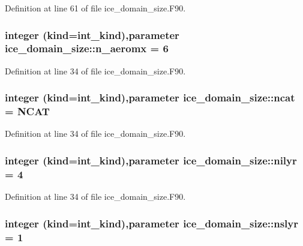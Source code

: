 Definition at line 61 of file ice\_\-domain\_\-size.F90.\hypertarget{namespaceice__domain__size_a61a60feb03a21a007ce6e62858188393}{
\subsubsection[{n\_\-aeromx}]{\setlength{\rightskip}{0pt plus 5cm}integer (kind=int\_\-kind),parameter {\bf ice\_\-domain\_\-size::n\_\-aeromx} = 6}}
\label{namespaceice__domain__size_a61a60feb03a21a007ce6e62858188393}


Definition at line 34 of file ice\_\-domain\_\-size.F90.\hypertarget{namespaceice__domain__size_af6426e75baee1427e99bac2564d5afd7}{
\subsubsection[{ncat}]{\setlength{\rightskip}{0pt plus 5cm}integer (kind=int\_\-kind),parameter {\bf ice\_\-domain\_\-size::ncat} = NCAT}}
\label{namespaceice__domain__size_af6426e75baee1427e99bac2564d5afd7}


Definition at line 34 of file ice\_\-domain\_\-size.F90.\hypertarget{namespaceice__domain__size_a5c1a0b8bcf4dc16b485be17beea4f6bf}{
\subsubsection[{nilyr}]{\setlength{\rightskip}{0pt plus 5cm}integer (kind=int\_\-kind),parameter {\bf ice\_\-domain\_\-size::nilyr} = 4}}
\label{namespaceice__domain__size_a5c1a0b8bcf4dc16b485be17beea4f6bf}


Definition at line 34 of file ice\_\-domain\_\-size.F90.\hypertarget{namespaceice__domain__size_aa5abf2eae8654b241bf06dac90d70c6b}{
\subsubsection[{nslyr}]{\setlength{\rightskip}{0pt plus 5cm}integer (kind=int\_\-kind),parameter {\bf ice\_\-domain\_\-size::nslyr} = 1}}
\label{namespaceice__domain__size_aa5abf2eae8654b241bf06dac90d70c6b}



